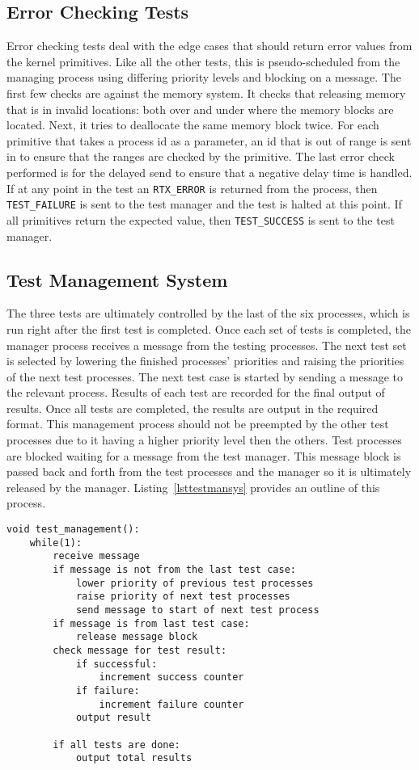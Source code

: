 \documentclass[oneside]{article}
\begin{document}
\subsection*{Error Checking Tests}
Error checking tests deal with the edge cases that should return error
values from the kernel primitives. Like all the other tests, this is
pseudo-scheduled from the managing process using differing priority
levels and blocking on a message. The first few checks are against the
memory system. It checks that releasing memory that is in invalid
locations: both over and under where the memory blocks are
located. Next, it tries to deallocate the same memory block twice.
For each primitive that takes a process id as a parameter, an id that
is out of range is sent in to ensure that the ranges are checked by
the primitive. The last error check performed is for the delayed send
to ensure that a negative delay time is handled. If at any point in
the test an \texttt{RTX\_ERROR} is returned from the process, then
\texttt{TEST\_FAILURE} is sent to the test manager and the test is
halted at this point. If all primitives return the expected value,
then \texttt{TEST\_SUCCESS} is sent to the test manager.

\subsection*{Test Management System}
The three tests are ultimately controlled by the last of the six
processes, which is run right after the first test is completed. Once
each set of tests is completed, the manager process receives a message
from the testing processes.  The next test set is selected by lowering
the finished processes' priorities and raising the priorities of the
next test processes. The next test case is started by sending a
message to the relevant process. Results of each test are recorded for
the final output of results. Once all tests are completed, the results
are output in the required format. This management process should
not be preempted by the other test processes due to it having a higher
priority level then the others. Test processes are blocked waiting for
a message from the test manager. This message block is passed back and
forth from the test processes and the manager so it is ultimately
released by the manager.  Listing~\ref{lsttestmansys} provides an
outline of this process.

\begin{lstlisting}
void test_management():
    while(1):
        receive message
        if message is not from the last test case:
            lower priority of previous test processes
            raise priority of next test processes
            send message to start of next test process
        if message is from last test case:
            release message block
        check message for test result:
            if successful:
                increment success counter
            if failure:
                increment failure counter
            output result
        
        if all tests are done:
            output total results
\end{lstlisting}
\end{document}
